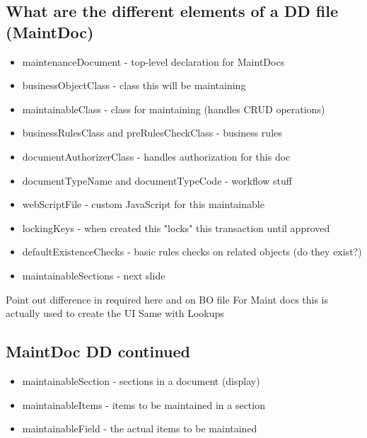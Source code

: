 \begin{ifhtml}
\begin{s5slide}
        \section{What are the different elements of a DD file (MaintDoc)}
            \begin{itemize}
                \item maintenanceDocument - top-level declaration for MaintDocs
                \item businessObjectClass - class this will be maintaining
                \item maintainableClass - class for maintaining (handles CRUD operations)
                \item businessRulesClass and preRulesCheckClass - business rules
                \item documentAuthorizerClass - handles authorization for this doc
                \item documentTypeName and documentTypeCode - workflow stuff
                \item webScriptFile - custom JavaScript for this maintainable
                \item lockingKeys - when created this "locks" this transaction until approved
                \item defaultExistenceChecks - basic rules checks on related objects (do they exist?)
                \item maintainableSections - next slide
            \end{itemize}
            \begin{s5notes}
                Point out difference in required here and on BO file
                For Maint docs this is actually used to create the UI
                Same with Lookups
            \end{s5notes}
            
    \end{s5slide}
    \begin{s5slide}
        \section{MaintDoc DD continued}
            \begin{itemize}
                \item maintainableSection - sections in a document (display)
                \item maintainableItems - items to be maintained in a section
                \item maintainableField - the actual items to be maintained
            \end{itemize}
    \end{s5slide}
    \begin{s5slide}

\end{s5slide}
\end{ifhtml}
